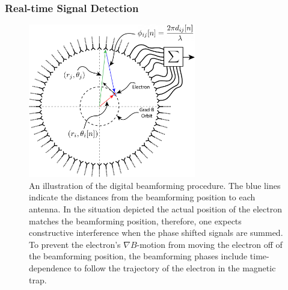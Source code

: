 

\subsubsection{Real-time Signal Detection}
\label{sec:bf-and-stft}

\begin{figure}[htbp]
    \centering
    \includegraphics[width=0.65\textwidth]{figs/Chapter-4/230803_beamforming_diagram.png}
    \caption{An illustration of the digital beamforming procedure. The blue lines indicate the distances from the beamforming position to each antenna. In the situation depicted the actual position of the electron matches the beamforming position, therefore, one expects constructive interference when the phase shifted signals are summed. To prevent the electron's $\nabla B$-motion from moving the electron off of the beamforming position, the beamforming phases include time-dependence to follow the trajectory of the electron in the magnetic trap.}
    \label{fig:chap4-beamforming}
\end{figure}

